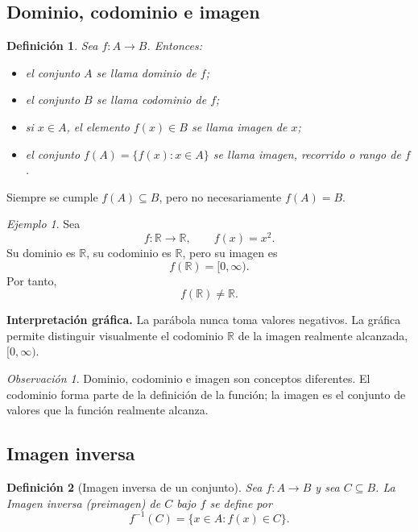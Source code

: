 \documentclass[12pt]{article}
\newtheorem{definicion}{Definición}[section]
\theoremstyle{remark}
\newtheorem{observacion}{Observación}[section]
\newtheorem{ejemplo}{Ejemplo}[section]
\newcommand{\R}{\mathbb{R}}
\begin{document}
\subsection*{Dominio, codominio e imagen}
\begin{definicion}
Sea $f:A\to B$. Entonces:

\begin{itemize}
    \item el conjunto $A$ se llama \emph{dominio} de $f$;
    \item el conjunto $B$ se llama \emph{codominio} de $f$;
    \item si $x\in A$, el elemento $f(x)\in B$ se llama \emph{imagen} de $x$;
    \item el conjunto $f(A)=\{f(x):x\in A\}$ se llama \emph{imagen}, \emph{recorrido} o \emph{rango} de $f$.
\end{itemize}
\end{definicion}

Siempre se cumple $f(A)\subseteq B$, pero no necesariamente $f(A)=B$.

\begin{ejemplo}
Sea
\[
f:\R\to\R,\qquad f(x)=x^2.
\]
Su dominio es $\R$, su codominio es $\R$, pero su imagen es
\[
f(\R)=[0,\infty).
\]
Por tanto,
\[
f(\R)\neq\R.
\]

\textbf{Interpretación gráfica.} La parábola nunca toma valores negativos.
La gráfica permite distinguir visualmente el codominio $\R$ de la imagen
realmente alcanzada, $[0,\infty)$.
\begin{center}
\end{center}
\end{ejemplo}

\begin{observacion}
Dominio, codominio e imagen son conceptos diferentes. El codominio forma parte de la definición de la función; la imagen es el conjunto de valores que la función realmente alcanza.
\end{observacion}
\subsection*{Imagen inversa}
\begin{definicion}[Imagen inversa de un conjunto]
Sea $f:A\to B$ y sea $C\subseteq B$. La Imagen inversa (preimagen) de $C$ bajo $f$ se define por
\[
f^{-1}(C)=\{x\in A:f(x)\in C\}.
\]
\end{definicion}
\end{document}
